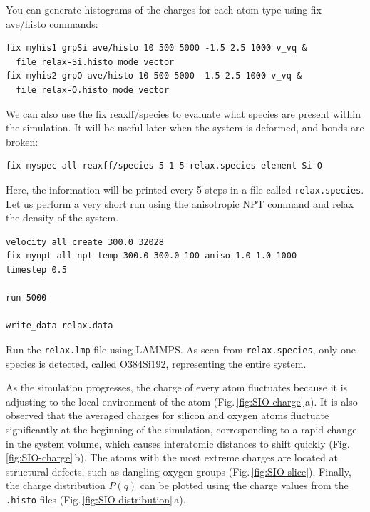 \documentclass[9pt,tutorial]{livecoms}
\newcommand{\lmpcmd}[1]{\hspace{0pt}\colorbox{listing}{\textcolor{command}{\small{#1}}}\hspace{0pt}} %
\newcommand{\flecmd}[1]{\textcolor{command}{\texttt{#1}}} %
\begin{document}
You can generate histograms of the charges for each atom type using
\lmpcmd{fix ave/histo} commands:
\begin{lstlisting}
fix myhis1 grpSi ave/histo 10 500 5000 -1.5 2.5 1000 v_vq &
  file relax-Si.histo mode vector
fix myhis2 grpO ave/histo 10 500 5000 -1.5 2.5 1000 v_vq &
  file relax-O.histo mode vector    
\end{lstlisting}
We can also use the \lmpcmd{fix reaxff/species} to evaluate what species are
present within the simulation.  It will be useful later when the system is deformed,
and bonds are broken:
\begin{lstlisting}
fix myspec all reaxff/species 5 1 5 relax.species element Si O
\end{lstlisting}
Here, the information will be printed every 5 steps in a file called \flecmd{relax.species}.
Let us perform a very short run using the anisotropic NPT command and relax the
density of the system.
\begin{lstlisting}
velocity all create 300.0 32028
fix mynpt all npt temp 300.0 300.0 100 aniso 1.0 1.0 1000
timestep 0.5

run 5000

write_data relax.data
\end{lstlisting}
Run the \flecmd{relax.lmp} file using LAMMPS.  As seen from \flecmd{relax.species},
only one species is detected, called \lmpcmd{O384Si192}, representing the entire system.

As the simulation progresses, the charge of every atom fluctuates
because it is adjusting to the local environment of the atom (Fig.\,\ref{fig:SIO-charge}\,a).
It is also observed that the averaged charges for silicon and oxygen
atoms fluctuate significantly at the beginning of the simulation, corresponding
to a rapid change in the system volume, which causes interatomic distances to
shift quickly (Fig.\,\ref{fig:SIO-charge}\,b).  The atoms with the
most extreme charges are located at structural defects,
such as dangling oxygen groups (Fig.\,\ref{fig:SIO-slice}).
Finally, the charge distribution $P(q)$ can be plotted using the charge values
from the \flecmd{.histo} files (Fig.\,\ref{fig:SIO-distribution}\,a).
\end{document}
